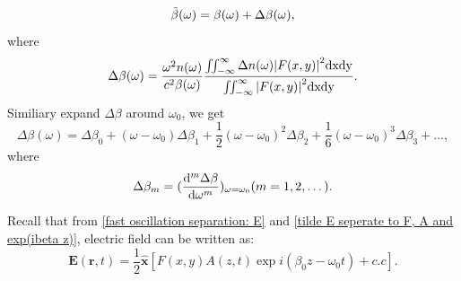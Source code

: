 \documentclass[12pt]{extarticle}
\numberwithin{equation}{section}
\numberwithin{figure}{section}
\numberwithin{table}{section}
\newcommand{\<}{\langle}
\renewcommand{\>}{\rangle}
\theoremstyle{definition}
\begin{document}
\begin{itemize}
{\begin{equation}
                    \Tilde{\beta}(\omega) = \beta(\omega) + \Delta \beta(\omega),
                    \label{tilde beta and delta beta relation}
                \end{equation}
                where
                \begin{equation}
                    \Delta \beta(\omega) = \frac{\omega^2 n(\omega)}{c^2 \beta(\omega)} \frac{\iint _{-\infty}^\infty \Delta n(\omega) \abs{F(x,y)}^2 \mathrm{dxdy}}{\iint_{-\infty}^\infty \abs{F(x,y)}^2 \mathrm{dxdy}}.
                    \label{delta beta intergral relation with F(x,y)}
                \end{equation}
                Similiary expand $\Delta \beta$ around $\omega_0$, we get
                \begin{equation}
                    \Delta \beta(\omega) = \Delta \beta_0 + (\omega-\omega_0)\Delta \beta_1 + \frac{1}{2}(\omega-\omega_0)^2\Delta \beta_2 + \frac{1}{6}(\omega-\omega_0)^3\Delta \beta_3 + \dots,
                    \label{Delta beta omega expands around omega 0}
                \end{equation}
                where
                \begin{equation}
                    \Delta \beta_m = (\dv[m]{\Delta \beta}{\omega})_{\omega=\omega_0}     (m=1,2,\dots).
                    \label{Delta beta m expression as Delta beta derivative}
                \end{equation}
            }
            
            Recall that from \autoref{fast oscillation separation: E} and \autoref{tilde E seperate to F, A and exp(ibeta z)}, electric field can be written as:
            \begin{equation}
                \boldsymbol{E}(\boldsymbol{r},t)=\frac{1}{2}\boldsymbol{\hat{x}}[F(x,y)A(z,t)\exp{i(\beta_0 z-\omega_0 t)}+c.c].
            \end{equation}
            

\end{itemize}
\end{document}
